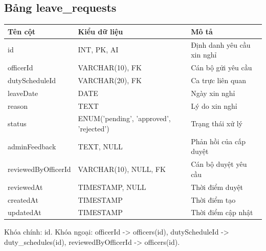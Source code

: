 \documentclass[18pt,a4paper]{report}
\begin{document}
\subsection{Bảng leave\_requests}
\begin{longtable}{|>{\raggedright\arraybackslash}p{4.5cm}|>{\raggedright\arraybackslash}p{4.5cm}|>{\raggedright\arraybackslash}p{6.5cm}|}
\hline
\textbf{Tên cột} & \textbf{Kiểu dữ liệu} & \textbf{Mô tả} \\ \hline
id & INT, PK, AI & Định danh yêu cầu xin nghỉ \\ \hline
officerId & VARCHAR(10), FK & Cán bộ gửi yêu cầu \\ \hline
dutyScheduleId & VARCHAR(20), FK & Ca trực liên quan \\ \hline
leaveDate & DATE & Ngày xin nghỉ \\ \hline
reason & TEXT & Lý do xin nghỉ \\ \hline
status & ENUM('pending', 'approved', 'rejected') & Trạng thái xử lý \\ \hline
adminFeedback & TEXT, NULL & Phản hồi của cấp duyệt \\ \hline
reviewedByOfficerId & VARCHAR(10), NULL, FK & Cán bộ duyệt yêu cầu \\ \hline
reviewedAt & TIMESTAMP, NULL & Thời điểm duyệt \\ \hline
createdAt & TIMESTAMP & Thời điểm tạo \\ \hline
updatedAt & TIMESTAMP & Thời điểm cập nhật \\ \hline
\end{longtable}
Khóa chính: id. Khóa ngoại: officerId -> officers(id), dutyScheduleId -> duty\_schedules(id), reviewedByOfficerId -> officers(id).
\end{document}
